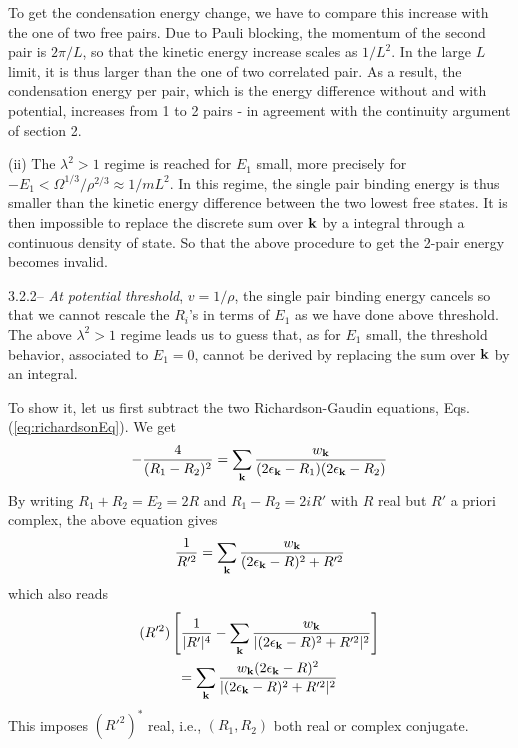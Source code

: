 \documentclass[5p,twocolumn]{elsarticle}
\begin{document}
To get the condensation energy change, we have to compare this increase with the one of two free pairs.  Due to Pauli blocking, the momentum of the second pair is $2\pi/L$, so that the kinetic energy increase scales as $1/L^{2}$.  In the large $L$ limit, it is thus larger than the one of two correlated pair. 
As a result, the condensation energy per pair, which is the energy difference without and with potential, increases from 1 to 2 pairs - in agreement with the continuity argument of section 2. 

(ii) The $\lambda^{2}>1$ regime is  reached for $E_{1}$ small, more precisely for $-E_{1}<\Omega^{1/3}/\rho^{2/3}\approx1/mL^{2}$.  In this regime, the single pair binding energy is thus smaller than the kinetic energy difference between the two lowest free states. It is then impossible to replace the discrete sum over $\mathbf{k}$ by a integral through a continuous density of state.  So that the above procedure to get the 2-pair energy becomes invalid.  


3.2.2-- {\it At potential threshold}, $v=1/\rho$, the single pair binding energy cancels so that we cannot rescale the $R_i$'s in terms of $E_1$ as we have done above threshold. The above $\lambda^{2}>1$ regime leads us to guess that, as for $E_1$ small, the threshold behavior, associated to $E_1=0$, cannot be derived by replacing the sum over $\mathbf{k}$ by an integral.

To show it, let us first subtract the two Richardson-Gaudin equations, Eqs.(\ref{eq:richardsonEq}). We get
\begin{equation}
-\frac{4}{(R_1-R_2)^2}=\sum_{\mathbf{k}}\frac{w_{\mathbf{k}}}{(2\epsilon_{\mathbf{k}}-R_1)(2\epsilon_{\mathbf{k}}-R_2)}\label{eq:2PairMinus}
\end{equation}
By writing $R_1+R_2=E_2=2R$ and $R_1-R_2=2iR'$ with $R$ real but $R'$ a priori complex, the above equation gives 
\begin{equation}
\frac{1}{R'^2}=\sum_{\mathbf{k}}\frac{w_{\mathbf{k}}}{(2\epsilon_{\mathbf{k}}-R)^2+R'^2}
\end{equation}
which also reads 
\begin{multline}
(R'^{2})\left[\frac{1}{|R'|^{4}}-\sum_{\mathbf{k}}\frac{w_{\mathbf{k}}}{|(2\epsilon_{\mathbf{k}}-R)^{2}+R'^{2}|^{2}}\right]\\
=\sum_{\mathbf{k}}\frac{w_{\mathbf{k}}(2\epsilon_{\mathbf{k}}-R)^{2}}{|(2\epsilon_{\mathbf{k}}-R)^{2}+R'^{2}|^{2}}
\end{multline}
This imposes $(R'^2)^*$ real, i.e., $(R_1,R_2)$ both real or complex conjugate.
\end{document}
